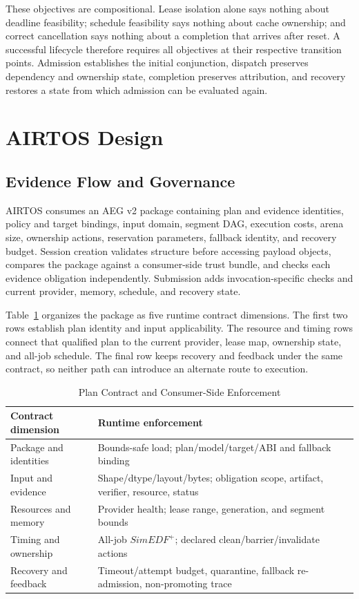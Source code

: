 \documentclass[lettersize,journal]{IEEEtran}
\begin{document}
These objectives are compositional. Lease isolation alone says nothing about
deadline feasibility; schedule feasibility says nothing about cache ownership;
and correct cancellation says nothing about a completion that arrives after
reset. A successful lifecycle therefore requires all objectives at their
respective transition points. Admission establishes the initial conjunction,
dispatch preserves dependency and ownership state, completion preserves
attribution, and recovery restores a state from which admission can be
evaluated again.

\section{AIRTOS Design}
\subsection{Evidence Flow and Governance}
AIRTOS consumes an AEG v2 package containing plan and evidence identities,
policy and target bindings, input domain, segment DAG, execution costs, arena
size, ownership actions, reservation parameters, fallback identity, and
recovery budget. Session creation validates structure before accessing payload
objects, compares the package against a consumer-side trust bundle, and checks
each evidence obligation independently. Submission adds invocation-specific
checks and current provider, memory, schedule, and recovery state.

Table~\ref{tab:contract} organizes the package as five runtime contract
dimensions. The first two rows establish plan identity and input
applicability. The resource and timing rows connect that qualified plan to the
current provider, lease map, ownership state, and all-job schedule. The final
row keeps recovery and feedback under the same contract, so neither path can
introduce an alternate route to execution.

\begin{table}[t]
\caption{Plan Contract and Consumer-Side Enforcement}
\label{tab:contract}
\centering
\footnotesize
\begin{tabular}{@{}p{}p{}@{}}
\toprule
Contract dimension & Runtime enforcement \\
\midrule
Package and identities & Bounds-safe load; plan/model/target/ABI and fallback binding \\
Input and evidence & Shape/dtype/layout/bytes; obligation scope, artifact, verifier, resource, status \\
Resources and memory & Provider health; lease range, generation, and segment bounds \\
Timing and ownership & All-job $SimEDF^+$; declared clean/barrier/invalidate actions \\
Recovery and feedback & Timeout/attempt budget, quarantine, fallback re-admission, non-promoting trace \\
\bottomrule
\end{tabular}
\end{table}
\end{document}
